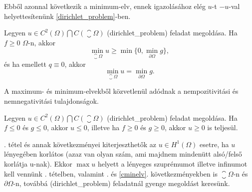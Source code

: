  Ebből azonnal következik a minimum-elv, ennek igazolásához elég $u$-t $-u$-val helyettesítenünk \eqref{dirichlet_problem}-ben.

\begin{corollary}\label{cminelv}
	Legyen $u \in C^2(\Omega) \bigcap C(\closure{\Omega})$ \aref({dirichlet_problem}) feladat megoldása. Ha $f \geq 0$ $\Omega$-n, akkor
	\begin{equation*}
		\min_{\closure{\Omega}} u \geq \min \{0, \min_{\partial\Omega} g\},
	\end{equation*}
	 és ha emellett $q \equiv 0$, akkor
	\begin{equation*}
		\min_{\closure{\Omega}} u =  \min_{\partial\Omega} g .
	\end{equation*}
\end{corollary}

A maximum- és minimum-elvekből közvetlenül adódnak a nempozitivitási és nemnegativitási tulajdonságok. 

\begin{corollary}
	Legyen $u \in C^2(\Omega) \bigcap C(\closure{\Omega})$ \aref({dirichlet_problem}) feladat megoldása. Ha $f \leq 0$ és $g \leq 0$, akkor $u \leq 0$, illetve ha $f \geq 0$ és $g \geq 0$, akkor $u \geq 0$ is teljesül.
\end{corollary}

\begin{remark}
	. tétel és annak következményei kiterjeszthetők az $u \in H^1(\Omega)$ esetre, ha $u$ lényegében korlátos (azaz van olyan szám, ami majdnem mindenütt alsó/felső korlátja u-nak). Ekkor $\max{u}$ helyett a lényeges szuprémumot illetve infinumot kell vennünk . tételben, valamint . és \ref{cminelv}. következményekben is $\closure{\Omega}$-n és $\partial\Omega$-n, továbbá \aref({dirichlet_problem}) feladatnál gyenge megoldást keresünk. 
\end{remark}
